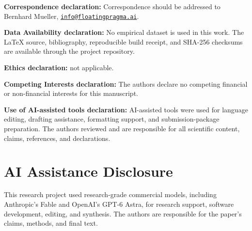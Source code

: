 \documentclass[11pt]{article}
\theoremstyle{definition}
\theoremstyle{remark}
\numberwithin{equation}{section}
\begin{document}
\noindent\textbf{Correspondence declaration:} Correspondence should be addressed to Bernhard
Mueller, \href{mailto:info@floatingpragma.ai}{\nolinkurl{info@floatingpragma.ai}}.

\noindent\textbf{Data Availability declaration:} No empirical dataset is used in this work. The
LaTeX source, bibliography, reproducible build receipt, and SHA-256 checksums
are available through the project repository.

\noindent\textbf{Ethics declaration:} not applicable.

\noindent\textbf{Competing Interests declaration:} The authors declare no competing financial or
non-financial interests for this manuscript.

\noindent\textbf{Use of AI-assisted tools declaration:} AI-assisted tools were used for language
editing, drafting assistance, formatting support, and submission-package preparation. The authors
reviewed and are responsible for all scientific content, claims, references, and declarations.




\section*{AI Assistance Disclosure}
This research project used research-grade commercial models, including
Anthropic's Fable and OpenAI's GPT-6 Astra, for research support, software
development, editing, and synthesis. The authors are responsible for the
paper's claims, methods, and final text.
\end{document}
